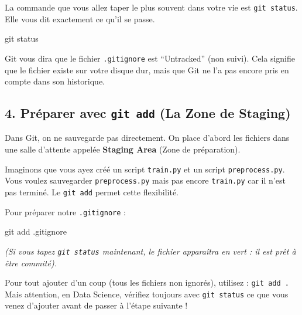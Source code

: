 \documentclass[
  letterpaper,
  DIV=11,
  numbers=noendperiod]{scrreprt}
\newenvironment{Shaded}{\begin{snugshade}}{\end{snugshade}}
\newcommand{\FunctionTok}[1]{\textcolor[rgb]{0.28,0.35,0.67}{#1}}
\newcommand{\NormalTok}[1]{\textcolor[rgb]{0.00,0.23,0.31}{#1}}
\begin{document}
La commande que vous allez taper le plus souvent dans votre vie est
\texttt{git\ status}. Elle vous dit exactement ce qu'il se passe.

\begin{Shaded}
\begin{Highlighting}[]
\FunctionTok{git}\NormalTok{ status}
\end{Highlighting}
\end{Shaded}

Git vous dira que le fichier \texttt{.gitignore} est ``Untracked'' (non
suivi). Cela signifie que le fichier existe sur votre disque dur, mais
que Git ne l'a pas encore pris en compte dans son historique.

\subsection{\texorpdfstring{4. Préparer avec \texttt{git\ add} (La Zone
de
Staging)}{4. Préparer avec git add (La Zone de Staging)}}\label{pruxe9parer-avec-git-add-la-zone-de-staging}

Dans Git, on ne sauvegarde pas directement. On place d'abord les
fichiers dans une salle d'attente appelée \textbf{Staging Area} (Zone de
préparation).

Imaginons que vous ayez créé un script \texttt{train.py} et un script
\texttt{preprocess.py}. Vous voulez sauvegarder \texttt{preprocess.py}
mais pas encore \texttt{train.py} car il n'est pas terminé. Le
\texttt{git\ add} permet cette flexibilité.

Pour préparer notre \texttt{.gitignore} :

\begin{Shaded}
\begin{Highlighting}[]
\FunctionTok{git}\NormalTok{ add .gitignore}
\end{Highlighting}
\end{Shaded}

\emph{(Si vous tapez \texttt{git\ status} maintenant, le fichier
apparaîtra en vert : il est prêt à être commité).}

\begin{tcolorbox}[enhanced jigsaw, arc=.35mm, bottomrule=.15mm, bottomtitle=1mm, breakable, colback=white, colbacktitle=quarto-callout-tip-color!10!white, colframe=quarto-callout-tip-color-frame, coltitle=black, left=2mm, leftrule=.75mm, opacityback=0, opacitybacktitle=0.6, rightrule=.15mm, title=\textcolor{quarto-callout-tip-color}{\faLightbulb}\hspace{0.5em}{Astuce}, titlerule=0mm, toprule=.15mm, toptitle=1mm]

Pour tout ajouter d'un coup (tous les fichiers non ignorés), utilisez :
\texttt{git\ add\ .} Mais attention, en Data Science, vérifiez toujours
avec \texttt{git\ status} ce que vous venez d'ajouter avant de passer à
l'étape suivante !

\end{tcolorbox}
\end{document}
